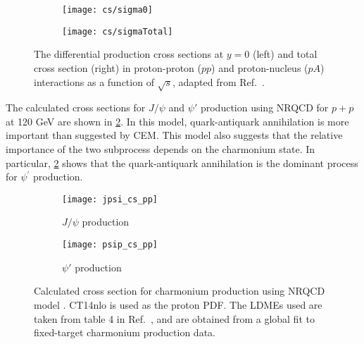 \documentclass[../main.tex]{subfiles}
\begin{document}
\begin{figure}[ht!]
	\centering
	\begin{subfigure}{0.45\linewidth}
		\texttt{[image: cs/sigma0]}
	\end{subfigure}
	\begin{subfigure}{0.45\linewidth}
		\texttt{[image: cs/sigmaTotal]}
	\end{subfigure}
	\caption{The differential production cross sections at $y=0$ (left) and total 
		cross section (right) in proton-proton ($pp$) and proton-nucleus ($pA$) interactions
		as a function of $\sqrt{s}$, adapted from Ref.~\cite{maltoni2006}.}
	\label{fig:charm_cs}
\end{figure}






The calculated cross sections for $J/\psi$ and $\psi'$ production using NRQCD for
$p+p$ at 120 GeV are shown in \cref{fig:NRQCD_cs}. In this model, quark-antiquark
annihilation is more important than suggested by CEM. This model also suggests
that the relative importance of the two subprocess depends on the charmonium state.
In particular, \cref{fig:NRQCD_cs} shows that the quark-antiquark annihilation
is the dominant process for $\psi^\prime$ production.
\begin{figure}[h!]
	\centering
	\begin{subfigure}{0.45\linewidth}
		\texttt{[image: jpsi\_cs\_pp]}
		\caption{$J/\psi$ production}
	\end{subfigure}
	\quad
	\begin{subfigure}{0.45\linewidth}
		\texttt{[image: psip\_cs\_pp]}
		\caption{$\psi'$ production}
	\end{subfigure}
	\caption{Calculated cross section for charmonium production using NRQCD model
		\cite{chang2021}. CT14nlo is used as the proton PDF. The LDMEs used are
		taken from table \num{4} in Ref.~\cite{hsieh2021}, and are obtained from a
		global fit to fixed-target charmonium production data. }
	\label{fig:NRQCD_cs}
\end{figure}



\ifSubfilesClassLoaded{ \printbibliography[heading=bibintoc,title={References}]}{}
\end{document}
